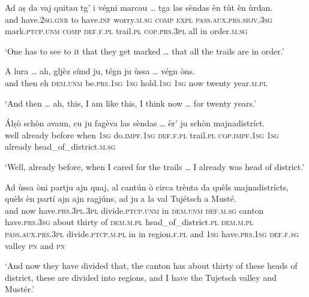 \begin{linenumbers}
\gll  Ad aṣ da vaj quitau tg’ i végni marcau … tga las sèndas èn tùt èn ùrdan.  \\
and have.\textsc{2sg.gnr} to have.\textsc{inf} worry.\textsc{m.sg} \textsc{comp} \textsc{expl} \textsc{pass.aux.prs.sbjv.3sg} mark.\textsc{ptcp.unm} {} \textsc{comp} \textsc{def.f.pl} trail.\textsc{pl} \textsc{cop.prs.3pl} all in order.\textsc{m.sg}  \\
\end{linenumbers}
\medskip
\glt `One has to see to it that they get marked … that all the trails are in order.'
\medskip

\begin{linenumbers}
\gll  A lura … ah, gljèz sùnd ju, tégn ju ùssa … végn òns.  \\
and then {} eh \textsc{dem.unm} be.\textsc{prs.1sg} \textsc{1sg} hold.\textsc{1sg}  \textsc{1sg} now {} twenty year.\textsc{m.pl} \\
\end{linenumbers} 
\medskip
\glt `And then … ah, this, I am like this, I think now … for twenty years.'
\medskip

\begin{linenumbers}
\gll  Álṣò schòn avaun, cu ju fagèva las sèndas … èr’ ju schòn majnadistríct.  \\
well already before when \textsc{1sg} do.\textsc{impf.1sg} \textsc{def.f.pl} trail.\textsc{pl} {} \textsc{cop.impf.1sg} \textsc{1sg} already head\_of\_district.\textsc{m.sg}\\
\end{linenumbers}
\medskip
\glt `Well, already before, when I cared for the trails … I already was head of district.'
\medskip

\begin{linenumbers}
\gll Ad ùssa òni partju ajn quaj, al cantún ò circa trènta da quèls majnadistrícts, quèls èn partí ajn ajn ragjúns, ad ju a la val Tujétsch a Musté.\footnotemark   \\
and now have.\textsc{prs.3pl.3pl} divide.\textsc{ptcp.unm} in \textsc{dem.unm} \textsc{def.m.sg} canton  have.\textsc{prs.3sg} about thirty of \textsc{dem.m.pl} head\_of\_district.\textsc{pl} \textsc{dem.m.pl} \textsc{pass.aux.prs.3pl} divide.\textsc{ptcp.m.pl} in in region.\textsc{f.pl} and \textsc{1sg} have.\textsc{prs.1sg} \textsc{def.f.sg} valley \textsc{pn} and \textsc{pn}\\
\end{linenumbers}
\medskip
\glt `And now they have divided that, the canton has about thirty of these heads of district, these are divided into regions, and I have the Tujetsch valley and Mustér.'
\medskip

